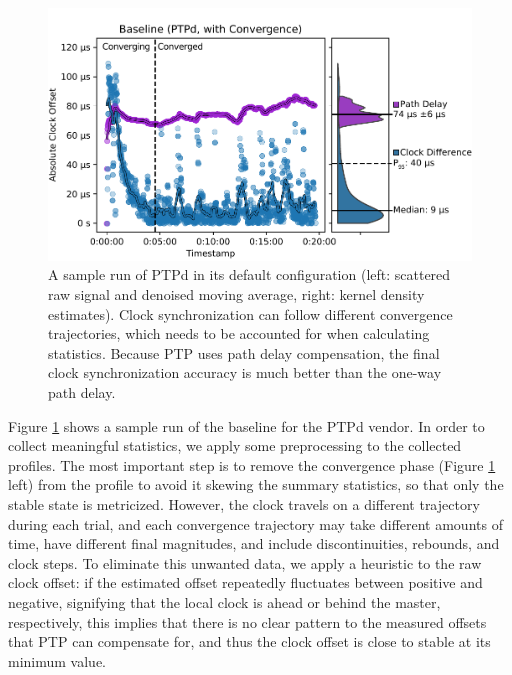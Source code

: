 \begin{figure}
    \includegraphics[width=\linewidth]{res/generated/base/rpi08-convergence_2.pdf}
    \caption{A sample run of PTPd in its default configuration (left: scattered raw signal and denoised moving average, right: kernel density estimates). Clock synchronization can follow different convergence trajectories, which needs to be accounted for when calculating statistics. Because PTP uses path delay compensation, the final clock synchronization accuracy is much better than the one-way path delay.}
    \label{fig:baseline_sample}
\end{figure}

Figure \ref{fig:baseline_sample} shows a sample run of the baseline for the PTPd vendor. In order to collect meaningful statistics, we apply some preprocessing to the collected profiles. The most important step is to remove the convergence phase (Figure \ref{fig:baseline_sample} left) from the profile to avoid it skewing the summary statistics, so that only the stable state is metricized. However, the clock travels on a different trajectory during each trial, and each convergence trajectory may take different amounts of time, have different final magnitudes, and include discontinuities, rebounds, and clock steps. To eliminate this unwanted data, we apply a heuristic to the raw clock offset: if the estimated offset repeatedly fluctuates between positive and negative, signifying that the local clock is ahead or behind the master, respectively, this implies that there is no clear pattern to the measured offsets that PTP can compensate for, and thus the clock offset is close to stable at its minimum value.

